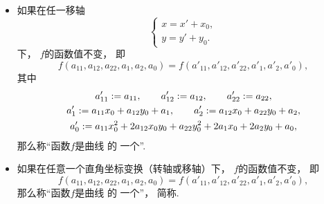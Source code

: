 \begin{definition}
\begin{itemize}
	\item 如果在任一移轴\begin{equation*}
		\left\{ \begin{array}{l}
			x = x' + x_0, \\
			y = y' + y_0.
		\end{array} \right.
	\end{equation*}下，
	\(f\)的函数值不变，
	即\begin{equation*}
		f(a_{11},a_{12},a_{22},a_1,a_2,a_0)
		= f(a'_{11},a'_{12},a'_{22},a'_1,a'_2,a'_0),
	\end{equation*}
	其中\begin{gather*}
		a'_{11} := a_{11},
		\qquad
		a'_{12} := a_{12},
		\qquad
		a'_{22} := a_{22}, \\
		a'_1 := a_{11} x_0 + a_{12} y_0 + a_1,
		\qquad
		a'_2 := a_{12} x_0 + a_{22} y_0 + a_2, \\
		a'_0 := a_{11} x_0^2
			+ 2 a_{12} x_0 y_0
			+ a_{22} y_0^2
			+ 2 a_1 x_0
			+ 2 a_2 y_0
			+ a_0,
	\end{gather*}
	那么称“函数\(f\)是曲线  的
	一个”.

	\item 如果在任意一个直角坐标变换（转轴或移轴）下，
	\(f\)的函数值不变，
	即\begin{equation*}
		f(a_{11},a_{12},a_{22},a_1,a_2,a_0)
		= f(a'_{11},a'_{12},a'_{22},a'_1,a'_2,a'_0),
	\end{equation*}
	那么称“函数\(f\)是曲线  的
	一个”，
	简称.


\end{itemize}
\end{definition}
